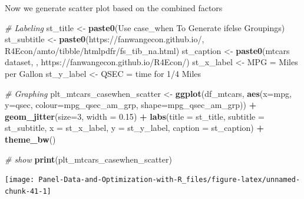 \documentclass[
]{book}
\newenvironment{Shaded}{\begin{snugshade}}{\end{snugshade}}
\newcommand{\CommentTok}[1]{\textcolor[rgb]{0.56,0.35,0.01}{\textit{#1}}}
\newcommand{\DataTypeTok}[1]{\textcolor[rgb]{0.13,0.29,0.53}{#1}}
\newcommand{\DecValTok}[1]{\textcolor[rgb]{0.00,0.00,0.81}{#1}}
\newcommand{\FloatTok}[1]{\textcolor[rgb]{0.00,0.00,0.81}{#1}}
\newcommand{\KeywordTok}[1]{\textcolor[rgb]{0.13,0.29,0.53}{\textbf{#1}}}
\newcommand{\NormalTok}[1]{#1}
\newcommand{\OperatorTok}[1]{\textcolor[rgb]{0.81,0.36,0.00}{\textbf{#1}}}
\newcommand{\StringTok}[1]{\textcolor[rgb]{0.31,0.60,0.02}{#1}}
\begin{document}
Now we generate scatter plot based on the combined factors

\begin{Shaded}
\begin{Highlighting}[]
\CommentTok{\# Labeling}
\NormalTok{st\_title \textless{}{-}}\StringTok{ }\KeywordTok{paste0}\NormalTok{(}\StringTok{\textquotesingle{}Use case\_when To Generate ifelse Groupings\textquotesingle{}}\NormalTok{)}
\NormalTok{st\_subtitle \textless{}{-}}\StringTok{ }\KeywordTok{paste0}\NormalTok{(}\StringTok{\textquotesingle{}https://fanwangecon.github.io/\textquotesingle{}}\NormalTok{,}
                      \StringTok{\textquotesingle{}R4Econ/amto/tibble/htmlpdfr/fs\_tib\_na.html\textquotesingle{}}\NormalTok{)}
\NormalTok{st\_caption \textless{}{-}}\StringTok{ }\KeywordTok{paste0}\NormalTok{(}\StringTok{\textquotesingle{}mtcars dataset, \textquotesingle{}}\NormalTok{,}
                     \StringTok{\textquotesingle{}https://fanwangecon.github.io/R4Econ/\textquotesingle{}}\NormalTok{)}
\NormalTok{st\_x\_label \textless{}{-}}\StringTok{ \textquotesingle{}MPG = Miles per Gallon\textquotesingle{}}
\NormalTok{st\_y\_label \textless{}{-}}\StringTok{ \textquotesingle{}QSEC = time for 1/4 Miles\textquotesingle{}}

\CommentTok{\# Graphing}
\NormalTok{plt\_mtcars\_casewhen\_scatter \textless{}{-}}\StringTok{ }
\StringTok{  }\KeywordTok{ggplot}\NormalTok{(df\_mtcars, }
         \KeywordTok{aes}\NormalTok{(}\DataTypeTok{x=}\NormalTok{mpg, }\DataTypeTok{y=}\NormalTok{qsec, }
             \DataTypeTok{colour=}\NormalTok{mpg\_qsec\_am\_grp, }
             \DataTypeTok{shape=}\NormalTok{mpg\_qsec\_am\_grp)) }\OperatorTok{+}
\StringTok{  }\KeywordTok{geom\_jitter}\NormalTok{(}\DataTypeTok{size=}\DecValTok{3}\NormalTok{, }\DataTypeTok{width =} \FloatTok{0.15}\NormalTok{) }\OperatorTok{+}
\StringTok{  }\KeywordTok{labs}\NormalTok{(}\DataTypeTok{title =}\NormalTok{ st\_title, }\DataTypeTok{subtitle =}\NormalTok{ st\_subtitle,}
       \DataTypeTok{x =}\NormalTok{ st\_x\_label, }\DataTypeTok{y =}\NormalTok{ st\_y\_label, }\DataTypeTok{caption =}\NormalTok{ st\_caption) }\OperatorTok{+}
\StringTok{  }\KeywordTok{theme\_bw}\NormalTok{()}

\CommentTok{\# show}
\KeywordTok{print}\NormalTok{(plt\_mtcars\_casewhen\_scatter)}
\end{Highlighting}
\end{Shaded}

\begin{center}\texttt{[image: Panel-Data-and-Optimization-with-R\_files/figure-latex/unnamed-chunk-41-1]} \end{center}
\end{document}
